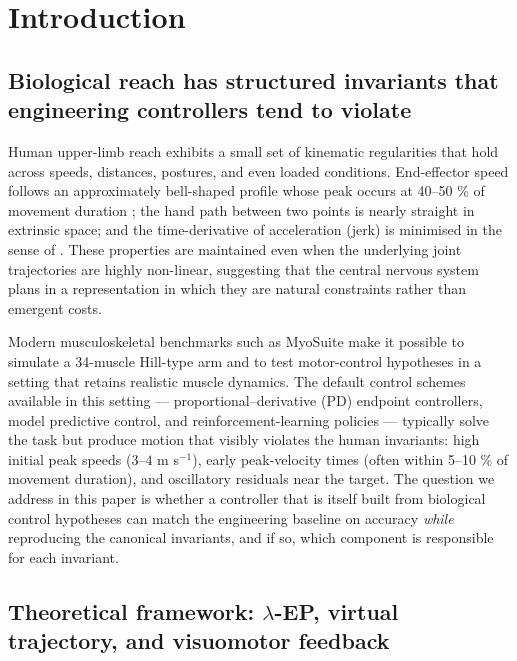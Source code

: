 \documentclass[sn-basic]{sn-jnl}
\begin{document}
\maketitle

\section{Introduction}

\subsection{Biological reach has structured invariants that
engineering controllers tend to
violate}

Human upper-limb reach exhibits a small set of kinematic regularities
that hold across speeds, distances, postures, and even loaded
conditions. End-effector speed follows an approximately bell-shaped
profile whose peak occurs at 40--50 \% of movement duration \citep{morasso1981, flashhogan1985}; the hand path between two points is nearly
straight in extrinsic space; and the time-derivative of acceleration
(jerk) is minimised in the sense of \citet{hogan1984}. These properties are
maintained even when the underlying joint trajectories are highly
non-linear, suggesting that the central nervous system plans in a
representation in which they are natural constraints rather than
emergent costs.

Modern musculoskeletal benchmarks such as MyoSuite \citep{caggiano2022} make it possible to simulate a 34-muscle Hill-type arm and to test
motor-control hypotheses in a setting that retains realistic muscle
dynamics. The default control schemes available in this setting ---
proportional--derivative (PD) endpoint controllers, model predictive
control, and reinforcement-learning policies --- typically solve the
task but produce motion that visibly violates the human invariants: high
initial peak speeds (\(3\)--\(4\) m s\(^{-1}\)), early peak-velocity
times (often within 5--10 \% of movement duration), and oscillatory
residuals near the target. The question we address in this paper is
whether a controller that is itself built from biological control
hypotheses can match the engineering baseline on accuracy \emph{while}
reproducing the canonical invariants, and if so, which component is
responsible for each invariant.

\subsection{Theoretical framework: $\lambda$-EP, virtual trajectory, and
visuomotor
feedback}
\end{document}
